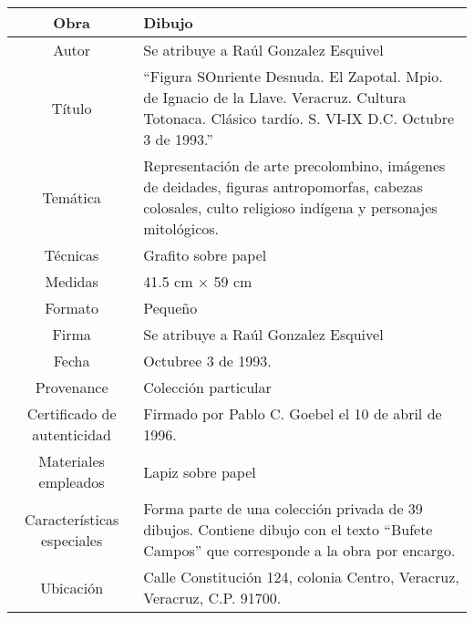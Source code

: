 \documentclass[10pt,letter]{report}
\begin{document}
\begin{table}[H]
\centering
\begin{tabular}{|c|m{}|}
\hline
Obra& Dibujo	\\
\hline
Autor & Se atribuye a Ra\'ul Gonzalez Esquivel\\
\hline
T\'itulo & ``Figura SOnriente Desnuda. El Zapotal. Mpio. de Ignacio de la Llave. Veracruz. Cultura Totonaca. Cl\'asico tard\'io. S. VI-IX D.C. Octubre 3 de 1993.''\\
\hline
Tem\'atica & Representaci\'on de arte precolombino, im\'agenes de deidades, figuras antropomorfas, cabezas colosales, culto religioso ind\'igena y personajes mitol\'ogicos.\\
\hline
T\'ecnicas &Grafito sobre papel \\
\hline
Medidas & 41.5 cm $\times$ 59 cm \\
\hline
 Formato & Peque\~no \\
 \hline
 Firma & Se atribuye a Ra\'ul Gonzalez Esquivel\\ 
 \hline
  Fecha & Octubree 3 de 1993.\\
 \hline
 Provenance & Colecci\'on particular\\
 \hline
 Certificado de autenticidad& Firmado por Pablo C. Goebel el 10 de abril de 1996.  \\
 \hline 
  Materiales empleados & Lapiz sobre papel\\
 \hline
 Caracter\'isticas especiales & Forma parte de una colecci\'on privada de 39 dibujos. 
Contiene dibujo con el texto ``Bufete Campos'' que corresponde a la obra por encargo. \\
\hline 
Ubicaci\'on & Calle Constituci\'on 124, colonia Centro, Veracruz, Veracruz, C.P. 91700.\\
\hline

\end{tabular}
\end{table}
\end{document}
